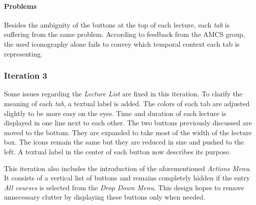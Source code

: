 \paragraph{Problems}
Besides the ambiguity of the buttons at the top of each lecture, each \emph{tab} is suffering from the same problem. According to feedback from the AMCS group, the used iconography alone fails to convey which temporal context each tab is representing.

\subsubsection{Iteration 3}
Some issues regarding the \emph{Lecture List} are fixed in this iteration.
To clarify the meaning of each \emph{tab}, a textual label is added. 
The colors of each tab are adjusted slightly to be more easy on the eyes. Time and duration of each lecture is displayed in one line next to each other. The two buttons previously discussed are moved to the bottom. They are expanded to take most of the width of the lecture box. The icons remain the same but they are reduced in size and pushed to the left.
A textual label in the center of each button now describes its purpose.

This iteration also includes the introduction of the aforementioned \emph{Actions Menu}. It consists of a vertical list of buttons and remains completely hidden if the entry \emph{All courses} is selected from the \emph{Drop Down Menu}. This design hopes to remove unnecessary clutter by displaying these buttons only when needed.

